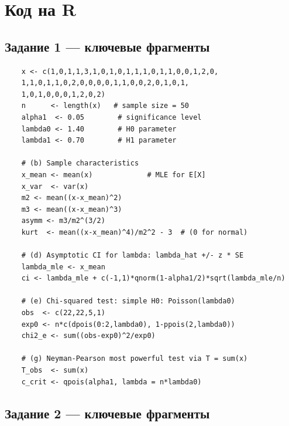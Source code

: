 \documentclass[12pt,a4paper]{article}
\begin{document}
	\newpage
	\section{Код на R}
	
	\subsection*{Задание 1 --- ключевые фрагменты}
	
\begin{lstlisting}
	x <- c(1,0,1,1,3,1,0,1,0,1,1,1,0,1,1,0,0,1,2,0,
	1,1,0,1,1,0,2,0,0,0,0,1,1,0,0,2,0,1,0,1,
	1,0,1,0,0,0,1,2,0,2)
	n      <- length(x)   # sample size = 50
	alpha1  <- 0.05        # significance level
	lambda0 <- 1.40        # H0 parameter
	lambda1 <- 0.70        # H1 parameter
	
	# (b) Sample characteristics
	x_mean <- mean(x)             # MLE for E[X]
	x_var  <- var(x)              
	m2 <- mean((x-x_mean)^2)     
	m3 <- mean((x-x_mean)^3)   
	asymm <- m3/m2^(3/2)        
	kurt  <- mean((x-x_mean)^4)/m2^2 - 3  # (0 for normal)
	
	# (d) Asymptotic CI for lambda: lambda_hat +/- z * SE
	lambda_mle <- x_mean        
	ci <- lambda_mle + c(-1,1)*qnorm(1-alpha1/2)*sqrt(lambda_mle/n)
	
	# (e) Chi-squared test: simple H0: Poisson(lambda0)
	obs  <- c(22,22,5,1)
	exp0 <- n*c(dpois(0:2,lambda0), 1-ppois(2,lambda0))
	chi2_e <- sum((obs-exp0)^2/exp0) 
	
	# (g) Neyman-Pearson most powerful test via T = sum(x)
	T_obs  <- sum(x)                        
	c_crit <- qpois(alpha1, lambda = n*lambda0) 
\end{lstlisting}

\subsection*{Задание 2 --- ключевые фрагменты}
\end{document}

